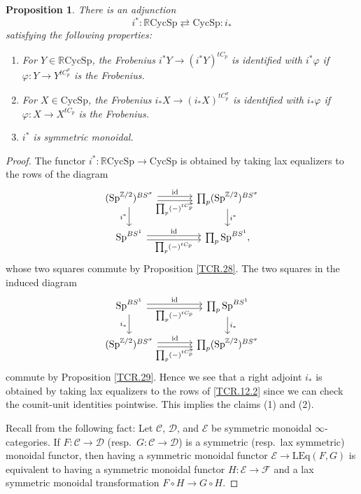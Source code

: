 \documentclass[10pt]{amsart}
\newtheorem{prop}[thm]{Proposition}
\theoremstyle{definition}
\theoremstyle{remark}
\numberwithin{equation}{section}
\newcommand{\Z}{\mathbb{Z}}
\newcommand{\cC}{\mathcal{C}}
\newcommand{\cD}{\mathcal{D}}
\newcommand{\cE}{\mathcal{E}}
\newcommand{\cF}{\mathcal{F}}
\newcommand{\id}{\mathrm{id}}
\newcommand{\Sp}{\mathrm{Sp}}
\newcommand{\LEq}{\mathrm{LEq}}
\newcommand{\CycSp}{\mathrm{CycSp}}
\newcommand{\RCycSp}{\mathbb{R}\mathrm{CycSp}}
\begin{document}
\begin{prop}
\label{TCR.12}
There is an adjunction
\[
i^*: \RCycSp \rightleftarrows \CycSp : i_*
\]
satisfying the following properties:
\begin{enumerate}
\item For $Y\in \RCycSp$,
the Frobenius $i^*Y\to (i^*Y)^{tC_p}$ is identified with $i^*\varphi$ if $\varphi\colon Y\to Y^{tC_p^\sigma}$ is the Frobenius.
\item For $X\in \CycSp$, the Frobenius $i_*X \to (i_*X)^{tC_p^\sigma}$ is identified with $i_*\varphi$ if $\varphi\colon X\to X^{tC_p}$ is the Frobenius.
\item $i^*$ is symmetric monoidal.
\end{enumerate}
\end{prop}
\begin{proof}
The functor $i^*\colon\RCycSp\to \CycSp$ is obtained by taking lax equalizers to the rows of the diagram
\begin{equation}
\label{TCR.12.1}
\begin{tikzcd}[column sep=large]
(\Sp^{\Z/2})^{BS^\sigma}\ar[r,shift left=0.5ex,"\id"]\ar[r,shift right=0.5ex,"\prod_p (-)^{tC_p^\sigma}"']\ar[d,"i^*"']&
\prod_p(\Sp^{\Z/2})^{BS^\sigma}\ar[d,"i^*"]
\\
\Sp^{BS^1}\ar[r,shift left=0.5ex,"\id"]\ar[r,shift right=0.5ex,"\prod_p (-)^{tC_p}"']&
\prod_p\Sp^{BS^1},
\end{tikzcd}
\end{equation}
whose two squares commute by Proposition \ref{TCR.28}.
The two squares in the induced diagram
\begin{equation}
\label{TCR.12.2}
\begin{tikzcd}[column sep=large]
\Sp^{BS^1}\ar[r,shift left=0.5ex,"\id"]\ar[r,shift right=0.5ex,"\prod_p (-)^{tC_p}"']\ar[d,"i_*"']&
\prod_p\Sp^{BS^1}\ar[d,"i_*"]
\\
(\Sp^{\Z/2})^{BS^\sigma}\ar[r,shift left=0.5ex,"\id"]\ar[r,shift right=0.5ex,"\prod_p (-)^{tC_p^\sigma}"']&
\prod_p(\Sp^{\Z/2})^{BS^\sigma}
\end{tikzcd}
\end{equation}
commute by Proposition \ref{TCR.29}.
Hence we see that a right adjoint $i_*$ is obtained by taking lax equalizers to the rows of \eqref{TCR.12.2} since we can check the counit-unit identities pointwise.
This implies the claims (1) and (2).

Recall from \cite[Construction IV.2.1(ii)]{NS} the following fact:
Let $\cC$, $\cD$, and $\cE$ be symmetric monoidal $\infty$-categories.
If $F\colon \cC\to \cD$ (resp.\ $G\colon \cC\to \cD$) is a symmetric (resp.\ lax symmetric) monoidal functor,
then having a symmetric monoidal functor $\cE\to \LEq(F,G)$ is equivalent to having a symmetric monoidal functor $H\colon \cE\to \cF$ and a lax symmetric monoidal transformation $F\circ H\to G\circ H$.


\end{proof}
\end{document}
